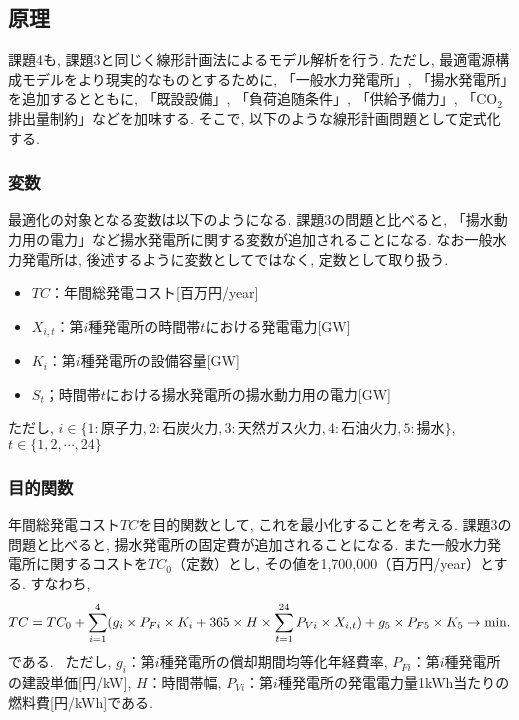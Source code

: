 \documentclass[]{jsarticle}
\begin{document}
  \subsection{原理}
      課題4も, 課題3と同じく線形計画法によるモデル解析を行う. ただし, 最適電源構成モデルをより現実的なものとするために, 「一般水力発電所」, 「揚水発電所」を追加するとともに, 「既設設備」, 「負荷追随条件」, 「供給予備力」, 「CO$_2$排出量制約」などを加味する. そこで, 以下のような線形計画問題として定式化する.

      \subsubsection{変数}
          最適化の対象となる変数は以下のようになる. 課題3の問題と比べると, 「揚水動力用の電力」など揚水発電所に関する変数が追加されることになる. なお一般水力発電所は, 後述するように変数としてではなく, 定数として取り扱う.
          \begin{itemize}
            \item $TC$：年間総発電コスト[百万円/year]
            \item $X_{i,t}$：第$i$種発電所の時間帯$t$における発電電力[GW]
            \item $K_i$：第$i$種発電所の設備容量[GW]
            \item $S_t$；時間帯$t$における揚水発電所の揚水動力用の電力[GW]
          \end{itemize}
          ただし, $i \in \{1:原子力, 2:石炭火力, 3:天然ガス火力, 4:石油火力, 5:揚水\}$, $t \in \{1, 2, \cdots , 24\}$

      \subsubsection{目的関数}
          年間総発電コスト$TC$を目的関数として, これを最小化することを考える. 課題3の問題と比べると, 揚水発電所の固定費が追加されることになる. また一般水力発電所に関するコストを$TC_0$（定数）とし, その値を1,700,000（百万円/year）とする. すなわち,
          \begin{eqnarray}
              TC = TC_0 + \sum_{i=1}^4 (g_i \times P_{Fi} \times K_i + 365 \times H \times \sum_{t=1}^{24} P_{Vi} \times X_{i, t}) + g_5 \times P_{F5} \times K_5 \to \rm{min}.
          \end{eqnarray}
          である. \
          ただし, $g_i$：第$i$種発電所の償却期間均等化年経費率, $P_{Fi}$：第$i$種発電所の建設単価[円/kW], $H$：時間帯幅, $P_{Vi}$：第$i$種発電所の発電電力量1kWh当たりの燃料費[円/kWh]である.
\end{document}
